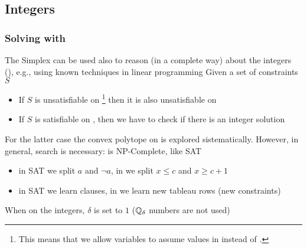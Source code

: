 \subsection{Integers}

\begin{frame}
  \frametitle{Solving \Lia with \Lra}

  The Simplex can be used also to reason (in a complete way) about the integers (\Lia),
  e.g., using known techniques in linear programming
  \vfill
  Given a set of \Lia constraints $S$
  \begin{itemize}
    \item If $S$ is unsatisfiable 
          on \Lra\footnote{This means that we allow variables to assume values in \Rat instead of \Int.}
	  then it is also unsatisfiable on \Lia
    \item If $S$ is satisfiable on \Lra, then we have to check if there is an integer solution
  \end{itemize}
  \vfill\pause
  For the latter case the convex polytope on \Rat is explored sistematically. 
  However, in general, search is necessary: \Lia is NP-Complete, like SAT
  \begin{itemize}
    \item in SAT we split $a$ and $\neg a$, in \Lia we split $x \leq c$ and $x \geq c+1$
    \item in SAT we learn clauses, in \Lia we learn new tableau rows (new constraints)
  \end{itemize}
  \vfill\pause
  When on the integers, $\delta$ is set to $1$ ($\mathbb{Q}_\delta$ numbers are not used)

\end{frame}
